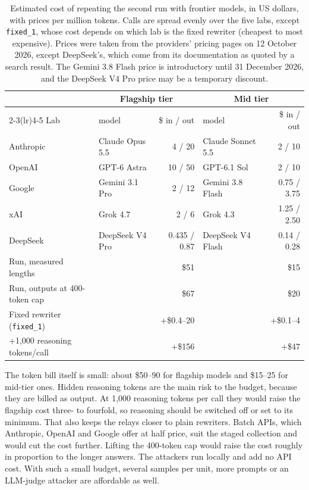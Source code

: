 \documentclass[11pt]{article}
\newcommand{\cond}[1]{\texttt{#1}}
\begin{document}
\begin{table}[t]
\centering
\small
\setlength{\tabcolsep}{4pt}
\begin{tabular}{@{}l l r l r@{}}
\toprule
 & \multicolumn{2}{c}{Flagship tier} & \multicolumn{2}{c}{Mid tier} \\
\cmidrule(lr){2-3}\cmidrule(lr){4-5}
Lab & model & \$ in / out & model & \$ in / out \\
\midrule
Anthropic & Claude Opus 5.5 & 4 / 20 & Claude Sonnet 5.5 & 2 / 10 \\
OpenAI & GPT-6 Astra & 10 / 50 & GPT-6.1 Sol & 2 / 10 \\
Google & Gemini 3.1 Pro & 2 / 12 & Gemini 3.8 Flash & 0.75 / 3.75 \\
xAI & Grok 4.7 & 2 / 6 & Grok 4.3 & 1.25 / 2.50 \\
DeepSeek & DeepSeek V4 Pro & 0.435 / 0.87 & DeepSeek V4 Flash & 0.14 / 0.28 \\
\midrule
Run, measured lengths & & \$51 & & \$15 \\
Run, outputs at 400-token cap & & \$67 & & \$20 \\
Fixed rewriter (\cond{fixed\_1}) & & +\$0.4--20 & & +\$0.1--4 \\
+1{,}000 reasoning tokens/call & & +\$156 & & +\$47 \\
\bottomrule
\end{tabular}
\caption{Estimated cost of repeating the second run with frontier models, in US dollars, with prices per million tokens. Calls are spread evenly over the five labs, except \cond{fixed\_1}, whose cost depends on which lab is the fixed rewriter (cheapest to most expensive). Prices were taken from the providers' pricing pages on 12 October 2026, except DeepSeek's, which come from its documentation as quoted by a search result. The Gemini 3.8 Flash price is introductory until 31 December 2026, and the DeepSeek V4 Pro price may be a temporary discount.}
\label{tab:cost}
\end{table}

The token bill itself is small: about \$50--90 for flagship models and \$15--25 for mid-tier ones. Hidden reasoning tokens are the main risk to the budget, because they are billed as output. At 1{,}000 reasoning tokens per call they would raise the flagship cost three- to fourfold, so reasoning should be switched off or set to its minimum. That also keeps the relays closer to plain rewriters. Batch APIs, which Anthropic, OpenAI and Google offer at half price, suit the staged collection and would cut the cost further. Lifting the 400-token cap would raise the cost roughly in proportion to the longer answers. The attackers run locally and add no API cost. With such a small budget, several samples per unit, more prompts or an LLM-judge attacker are affordable as well.
\end{document}
